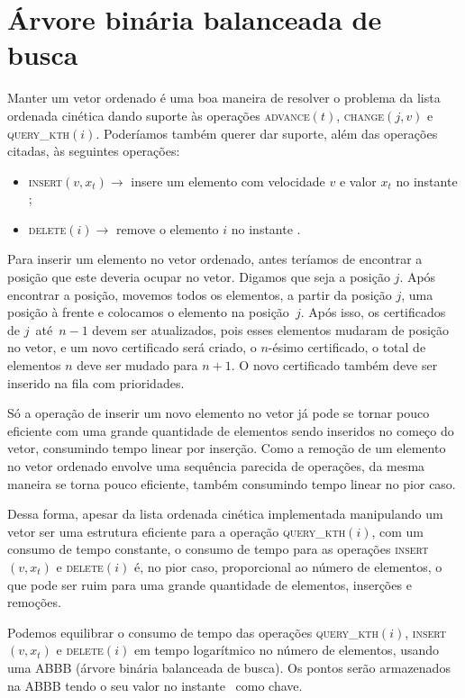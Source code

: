 
\section{Árvore binária balanceada de busca} \label{abb}

Manter um vetor ordenado é uma boa maneira de resolver o problema da
lista ordenada cinética dando suporte às operações
\textsc{advance}$(t)$, \textsc{change}$(j,v)$ e
\textsc{query\_kth}$(i)$. Poderíamos também querer dar suporte, além
das operações citadas, às seguintes operações:

\begin{itemize}
    \item \textsc{insert}$(v, x_t) \rightarrow$ insere um
    elemento com velocidade $v$ e valor $x_t$ no instante \now;
    \item \textsc{delete}$(i) \rightarrow$ remove o elemento
    $i$ no instante \now.
\end{itemize}

Para inserir um elemento no vetor ordenado, antes teríamos de
encontrar a posição que este deveria ocupar no vetor. Digamos que
seja a posição $j$. Após encontrar a posição, movemos todos os
elementos, a partir da posição $j$, uma posição à frente e colocamos
o elemento na posição~$j$. Após isso, os certificados de $j$~até~$n
- 1$ devem ser atualizados, pois esses elementos mudaram de posição
no vetor, e um novo certificado será criado, o $n$-ésimo
certificado, o total de elementos $n$ deve ser mudado para $n + 1$.
O novo certificado também deve ser inserido na fila com prioridades.

Só a operação de inserir um novo elemento no vetor já pode se tornar
pouco eficiente com uma grande quantidade de elementos sendo
inseridos no começo do vetor, consumindo tempo linear por inserção.
Como a remoção de um elemento no vetor ordenado envolve uma
sequência parecida de operações, da mesma maneira se torna pouco
eficiente, também consumindo tempo linear no pior caso.

Dessa forma, apesar da lista ordenada cinética implementada
manipulando um vetor ser uma estrutura eficiente para a operação
\textsc{query\_kth}$(i)$, com um consumo de tempo constante, o
consumo de tempo para as operações \textsc{insert}$(v, x_t)$ e
\textsc{delete}$(i)$ é, no pior caso, proporcional ao número de
elementos, o que pode ser ruim para uma grande quantidade de
elementos, inserções e remoções.

Podemos equilibrar o consumo de tempo das operações
\textsc{query\_kth}$(i)$, \textsc{insert}$(v, x_t)$ e
\textsc{delete}$(i)$ em tempo logarítmico no número de elementos,
usando uma ABBB (árvore binária balanceada de busca). Os pontos
serão armazenados na ABBB tendo o seu valor no instante \now~como
chave.

